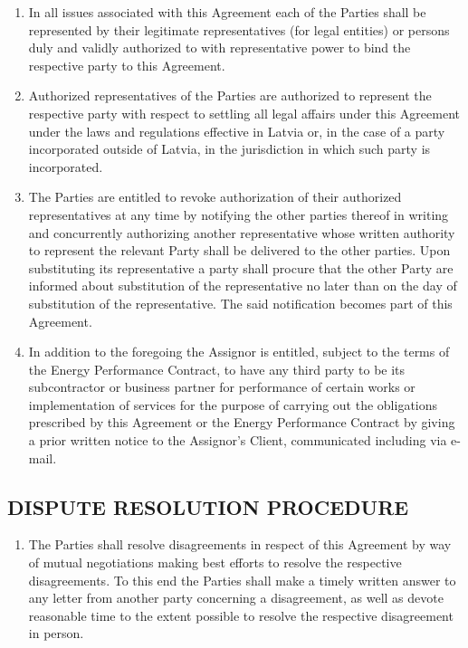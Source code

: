 \documentclass[a4paper]{article}
\begin{document}
\begin{multicols}{2}
  \begin{enumerate}
  \item{In all issues associated with this Agreement each of the
      Parties shall be represented by their legitimate representatives
      (for legal entities) or persons duly and validly authorized to
      with representative power to bind the respective party to this
      Agreement.}

  \item{Authorized representatives of the Parties are authorized to
      represent the respective party with respect to settling all
      legal affairs under this Agreement under the laws and
      regulations effective in Latvia or, in the case of a party
      incorporated outside of Latvia, in the jurisdiction in which
      such party is incorporated.  }

  \item{The Parties are entitled to revoke authorization of their
      authorized representatives at any time by notifying the other
      parties thereof in writing and concurrently authorizing another
      representative whose written authority to represent the relevant
      Party shall be delivered to the other parties. Upon substituting
      its representative a party shall procure that the other Party
      are informed about substitution of the representative no later
      than on the day of substitution of the representative. The said
      notification becomes part of this Agreement.}

  \item{In addition to the foregoing the Assignor is entitled, subject
      to the terms of the Energy Performance Contract, to have any
      third party to be its subcontractor or business partner for
      performance of certain works or implementation of services for
      the purpose of carrying out the obligations prescribed by this
      Agreement or the Energy Performance Contract by giving a prior
      written notice to the Assignor's Client, communicated including
      via e{-}mail.}
  \end{enumerate}

  \subsection{DISPUTE RESOLUTION PROCEDURE}

  \begin{enumerate}
  \item{The Parties shall resolve disagreements in respect of this
      Agreement by way of mutual negotiations making best efforts to
      resolve the respective disagreements. To this end the Parties
      shall make a timely written answer to any letter from another
      party concerning a disagreement, as well as devote reasonable
      time to the extent possible to resolve the respective
      disagreement in person.}


\end{enumerate}
\end{multicols}
\end{document}
